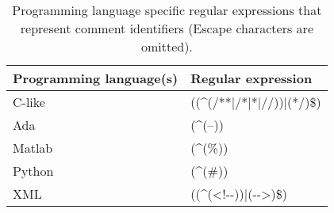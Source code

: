 \setlength{\extrarowheight}{.5em}
\begin{table}
	\caption[Comment enclosings]{Programming language specific regular expressions that represent comment identifiers (Escape characters are omitted).}
	\label{table:commentEnclosings}
	\begin{tabularx}{\textwidth}{l|L}
		\textbf{Programming language(s)} & Regular expression \\
		\hline
		C-like & ((\textasciicircum(/**|/*|*|//))|(*/)\$) \\
		Ada & (\textasciicircum(--)) \\
		Matlab & (\textasciicircum(\%)) \\
		Python & (\textasciicircum(\#)) \\
		XML & ((\textasciicircum(<!-{}-))|(-{}->)\$)
	\end{tabularx}
\end{table}
\setlength{\extrarowheight}{0em}
